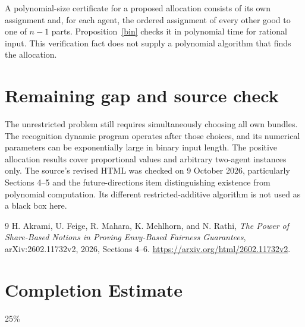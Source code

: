 \documentclass[11pt]{article}
\theoremstyle{definition}
\begin{document}
A polynomial-size certificate for a proposed allocation consists of its
own assignment and, for each agent, the ordered assignment of every other
good to one of $n-1$ parts. Proposition~\ref{bin} checks it in polynomial
time for rational input. This verification fact does not supply a
polynomial algorithm that finds the allocation.

\section{Remaining gap and source check}
The unrestricted problem still requires simultaneously choosing all own
bundles. The recognition dynamic program operates after those choices,
and its numerical parameters can be exponentially large in binary input
length. The positive allocation results cover proportional values and
arbitrary two-agent instances only. The source's revised HTML was checked
on 9 October 2026, particularly Sections 4--5 and the future-directions
item distinguishing existence from polynomial computation. Its different
restricted-additive algorithm is not used as a black box here.
\begin{thebibliography}{9}
 H. Akrami, U. Feige, R. Mahara, K. Mehlhorn, and N. Rathi,
\emph{The Power of Share-Based Notions in Proving Envy-Based Fairness
Guarantees}, arXiv:2602.11732v2, 2026, Sections 4--6.
\url{https://arxiv.org/html/2602.11732v2}.
\end{thebibliography}

\section{Completion Estimate}
25\%
\end{document}
